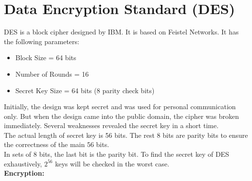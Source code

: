 \documentclass[11pt]{article}
\begin{document}
\section{Data Encryption Standard (DES)}
DES is a block cipher designed by IBM. It is based on Feistel Networks. It has the following parameters:
\begin{itemize}
    \item Block Size = 64 bits
    \item Number of Rounds = 16
    \item Secret Key Size = 64 bits (8 parity check bits)
\end{itemize}
\vspace{5mm}
Initially, the design was kept secret and was used for personal communication only. But when the design came into the public domain, the cipher was broken immediately. Several weaknesses revealed the secret key in a short time.\\
\vspace{3mm}
The actual length of secret key is 56 bits. The rest 8 bits are parity bits to ensure the correctness of the main 56 bits.\\
\vspace{3mm}
In sets of 8 bits, the last bit is the parity bit. To find the secret key of DES exhaustively, $2^{56}$ keys will be checked in the worst case.\\
\vspace{5mm}
\textbf{Encryption: }
\end{document}
